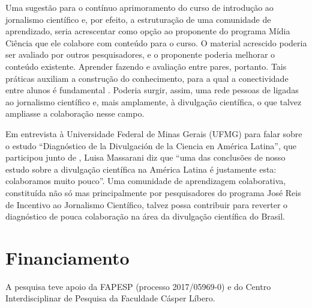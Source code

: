 \documentclass{textolivre}
\begin{document}
Uma sugestão para o contínuo aprimoramento do curso de introdução ao jornalismo científico e, por efeito, a estruturação de uma comunidade de aprendizado, seria acrescentar como opção ao proponente do programa Mídia Ciência que ele colabore com conteúdo para o curso. O material acrescido poderia ser avaliado por outros pesquisadores, e o proponente poderia melhorar o conteúdo existente. Aprender fazendo e avaliação entre pares, portanto. Tais práticas auxiliam a construção do conhecimento, para a qual a conectividade entre alunos é fundamental \cite[p. 173]{gomes2011}. Poderia surgir, assim, uma rede pessoas de ligadas ao jornalismo científico e, mais amplamente, à divulgação científica, o que talvez ampliasse a colaboração nesse campo. 

Em entrevista à Universidade Federal de Minas Gerais (UFMG) para falar sobre o estudo “Diagnóstico de la Divulgación de la Ciencia en América Latina”, que participou junto de \textcite{barba2017}, Luisa Massarani diz que “uma das conclusões de nosso estudo sobre a divulgação científica na América Latina é justamente esta: colaboramos muito pouco”. Uma comunidade de aprendizagem colaborativa, constituída não só mas principalmente por pesquisadores do programa José Reis de Incentivo ao Jornalismo Científico, talvez possa contribuir para reverter o diagnóstico de pouca colaboração na área da divulgação científica do Brasil.

\section{Financiamento}\label{sec-financiamento}
A pesquisa teve apoio da FAPESP (processo 2017/05969-0) e do Centro Interdisciplinar de Pesquisa da Faculdade Cásper Líbero.

\printbibliography\label{sec-bib}
\end{document}
